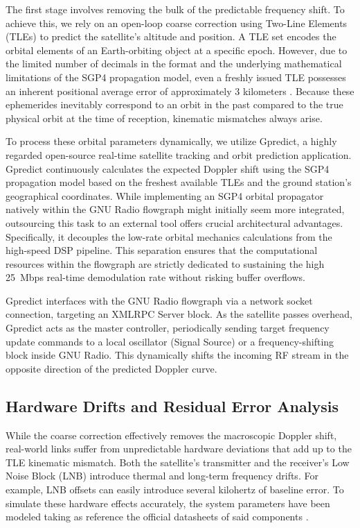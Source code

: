 The first stage involves removing the bulk of the predictable frequency shift. To achieve this, we rely on an open-loop coarse correction using Two-Line Elements (TLEs) to predict the satellite's altitude and position. A TLE set encodes the orbital elements of an Earth-orbiting object at a specific epoch. However, due to the limited number of decimals in the format and the underlying mathematical limitations of the SGP4 propagation model, even a freshly issued TLE possesses an inherent positional average error of approximately 3 kilometers \autocite{vallado2001fundamentals}. Because these ephemerides inevitably correspond to an orbit in the past compared to the true physical orbit at the time of reception, kinematic mismatches always arise.

To process these orbital parameters dynamically, we utilize Gpredict, a highly regarded open-source real-time satellite tracking and orbit prediction application. Gpredict \autocite{gr_gpredict_doppler} continuously calculates the expected Doppler shift using the SGP4 propagation model based on the freshest available TLEs and the ground station's geographical coordinates. While implementing an SGP4 orbital propagator natively within the GNU Radio flowgraph might initially seem more integrated, outsourcing this task to an external tool offers crucial architectural advantages. Specifically, it decouples the low-rate orbital mechanics calculations from the high-speed DSP pipeline. This separation ensures that the computational resources within the flowgraph are strictly dedicated to sustaining the high 25~Mbps real-time demodulation rate without risking buffer overflows.

Gpredict interfaces with the GNU Radio flowgraph via a network socket connection, targeting an XMLRPC Server block. As the satellite passes overhead, Gpredict acts as the master controller, periodically sending target frequency update commands to a local oscillator (Signal Source) or a frequency-shifting block inside GNU Radio. This dynamically shifts the incoming RF stream in the opposite direction of the predicted Doppler curve.

\subsection{Hardware Drifts and Residual Error Analysis}
\label{subsec:hardware_drifts}

While the coarse correction effectively removes the macroscopic Doppler shift, real-world links suffer from unpredictable hardware deviations that add up to the TLE kinematic mismatch. Both the satellite's transmitter and the receiver's Low Noise Block (LNB) introduce thermal and long-term frequency drifts. For example, LNB offsets can easily introduce several kilohertz of baseline error. To simulate these hardware effects accurately, the system parameters have been modeled taking as reference the official datasheets of said components \autocite{LNB_Manual}.

